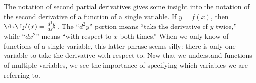 The notation of second partial derivatives gives some insight into the notation of the second derivative of a function of a single variable. If $y=f(x)$, then $\ds \fp'(x) = \frac{d^2 y}{dx^2}$. The ``$d^2y$'' portion means ``take the derivative of $y$ twice,'' while ``$dx^2$'' means ``with respect to $x$ both times.'' When we only know of functions of a single variable, this latter phrase seems silly: there is only one variable to take the derivative with respect to. Now that we understand functions of multiple variables, we see the importance of specifying which variables we are referring to.

